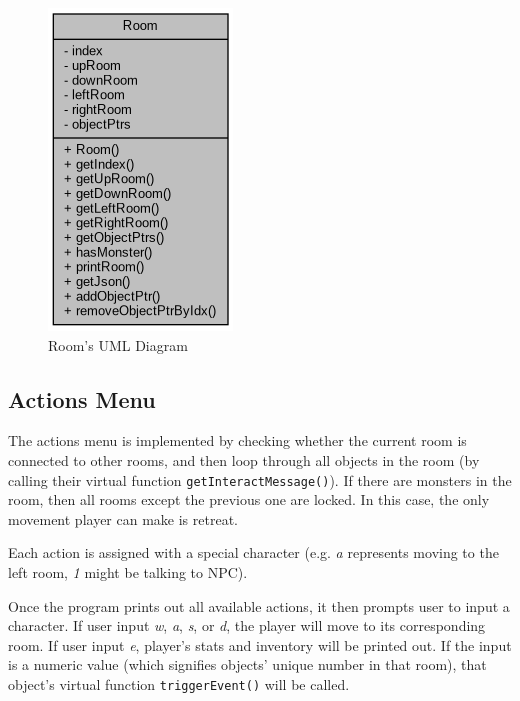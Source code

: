 \documentclass{article}
\begin{document}
\begin{figure}
\begin{center}
\begin{minipage}[c]{0.4\linewidth}
\begin{center}
                \includegraphics[width=0.5\linewidth]{room_uml}
                \end{center}
                \caption{Room's UML Diagram}
            \end{minipage}
        \end{center}
    \end{figure}
    
    \subsection{Actions Menu}
    The actions menu is implemented by checking whether the current room is connected to other rooms, and then loop through all objects in the room (by calling their virtual function \texttt{getInteractMessage()}). If there are monsters in the room, then all rooms except the previous one are locked. In this case, the only movement player can make is retreat.
    \par
    Each action is assigned with a special character (e.g. \textit{a} represents moving to the left room, \textit{1} might be talking to NPC).
    \par
    Once the program prints out all available actions, it then prompts user to input a character. If user input \textit{w}, \textit{a}, \textit{s}, or \textit{d}, the player will move to its corresponding room. If user input \textit{e}, player's stats and inventory will be printed out. If the input is a numeric value (which signifies objects' unique number in that room), that object's virtual function \texttt{triggerEvent()} will be called. 
    
\end{document}
